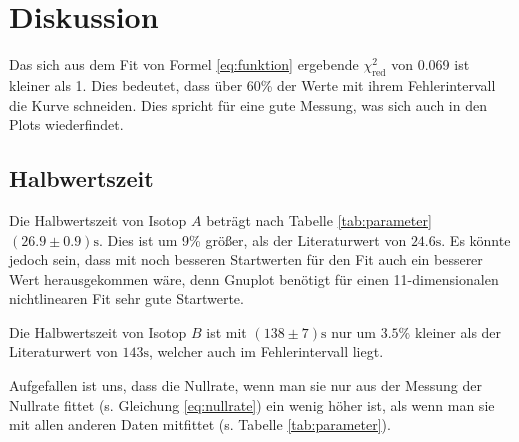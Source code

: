 \documentclass[12pt,a4paper,titlepage,headinclude,bibtotoc]{scrartcl}
\begin{document}
\section{Diskussion}
\label{sec:diskussion}
Das sich aus dem Fit von Formel \eqref{eq:funktion} ergebende $\chi_\text{red}^2$ von 0.069 ist kleiner als 1.
Dies bedeutet, dass über 60\% der Werte mit ihrem Fehlerintervall die Kurve schneiden.
Dies spricht für eine gute Messung, was sich auch in den Plots wiederfindet.

\subsection{Halbwertszeit}
Die Halbwertszeit von Isotop $A$ beträgt nach Tabelle \ref{tab:parameter} $(26.9 \pm 0.9)\si\second$.
Dies ist um 9\% größer, als der Literaturwert von $24.6\si\second$.
Es könnte jedoch sein, dass mit noch besseren Startwerten für den Fit auch ein besserer Wert herausgekommen wäre, denn Gnuplot benötigt für einen 11-dimensionalen nichtlinearen Fit sehr gute Startwerte.

Die Halbwertszeit von Isotop $B$ ist mit $(138\pm 7)\si\second$ nur um $3.5\%$ kleiner als der Literaturwert von $143\si\second$, welcher auch im Fehlerintervall liegt.

Aufgefallen ist uns, dass die Nullrate, wenn man sie nur aus der Messung der Nullrate fittet (s. Gleichung \eqref{eq:nullrate}) ein wenig höher ist, als wenn man sie mit allen anderen Daten mitfittet (s. Tabelle \ref{tab:parameter}).







\end{document}
